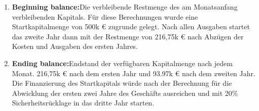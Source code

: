 \documentclass[11pt,a4paper]{report}
\begin{document}
\begin{enumerate}
    \item \textbf{Beginning balance:}\quad Die verbleibende Restmenge des am Monatsanfang verbleibenden Kapitals. Für diese Berechnungen wurde eine Startkapitalmenge von 500k € zugrunde gelegt. Nach allen Ausgaben startet das zweite Jahr dann mit der Restmenge von 216,75k € nach Abzügen der Kosten und Ausgaben des ersten Jahres.
    \item \textbf{Ending balance:}\quad Endstand der verfügbaren Kapitalmenge nach jedem Monat. 216,75k € nach dem ersten Jahr und 93.97k € nach dem zweiten Jahr. Die Finanzierung des Startkapitals würde nach der Berechnung für die Abwicklung der ersten zwei Jahre des Geschäfts ausreichen und mit 20\% Sicherheitsrücklage in das dritte Jahr starten.
    \end{enumerate}
\end{document}
